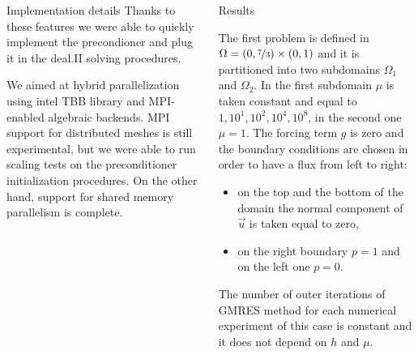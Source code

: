 \documentclass[final]{beamer}
\newlength{\onecolwid}
\begin{document}
\begin{frame}[t]
\begin{columns}[t]
\begin{column}{\onecolwid}
\begin{block}{Implementation details}
Thanks to these features we were able to quickly implement the precondioner
and plug it in the deal.II solving procedures.

We aimed at hybrid parallelization using intel TBB library and MPI-enabled
algebraic backends.
MPI support for distributed meshes is still experimental, but we were able
to run scaling tests on the preconditioner initialization procedures.
On the other hand, support for shared memory parallelism is complete.

\end{block}


\end{column} %


\begin{column}{\onecolwid} %

\begin{block}{Results}

The first problem is defined in $\Omega = (0,\nicefrac{7}{3}) \times (0,1)$ and
it is partitioned into two subdomains $\Omega_1$ and $\Omega_2$. In the first subdomain $\mu$ is taken
constant and equal to $1, 10^{1}, 10^{2}, 10^{4}, 10^{8}$, in the second one
$\mu=1$. The forcing term $g$ is zero and the boundary conditions are chosen in
order to have a  flux from left to right:
\begin{itemize}
  \item on the top and the bottom of the domain the normal component of
    $\vec{u}$ is taken equal to zero,
  \item on the right boundary $p=1$ and on the left one $p=0$.
\end{itemize}

\begin{figure}
    \begin{tikzpicture}[scale=2.5,font=\small]
        
    \end{tikzpicture}
\end{figure}

The number of outer iterations of GMRES method for each numerical experiment of
this case is constant and it does not depend on $h$ and $\mu$.

\begin{table}
    {\footnotesize }
\end{table}


\end{block}
\end{column}
\end{columns}
\end{frame}
\end{document}
